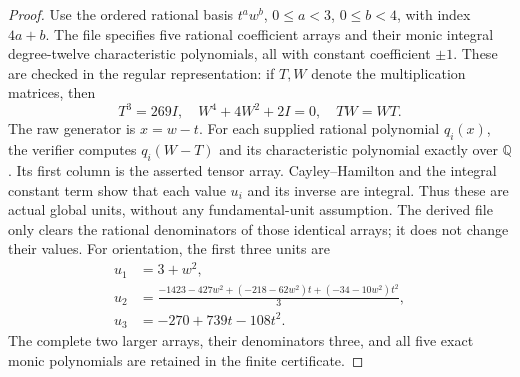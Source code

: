 \begin{proof}
Use the ordered rational basis $t^a w^b$, $0\le a<3$, $0\le b<4$,
with index $4a+b$.  The file
 specifies five
rational coefficient arrays and their monic integral degree-twelve
characteristic polynomials, all with constant coefficient $\pm1$.
These are checked in the regular representation: if $T,W$ denote
the multiplication matrices, then
\[
 T^3=269I,\quad W^4+4W^2+2I=0,\quad TW=WT.
 \tag{C16.7}
\]
The raw generator is $x=w-t$.  For each supplied rational
polynomial $q_i(x)$, the verifier computes $q_i(W-T)$ and its
characteristic polynomial exactly over $\mathbb Q$.
Its first column is the asserted tensor array.  Cayley--Hamilton
and the integral constant term show that each value $u_i$ and
its inverse are integral.  Thus these are actual global units,
without any fundamental-unit assumption.
The derived file 
only clears the rational denominators of those identical arrays;
it does not change their values.
For orientation, the first three units are
\[
 \begin{aligned}
 u_1&=3+w^2,\\
 u_2&=\frac{-1423-427w^2+(-218-62w^2)t+(-34-10w^2)t^2}{3},\\
 u_3&=-270+739t-108t^2.
 \end{aligned}
 \tag{C16.8}
\]
The complete two larger arrays, their denominators three, and all
five exact monic polynomials are retained in the finite certificate.


\end{proof}
